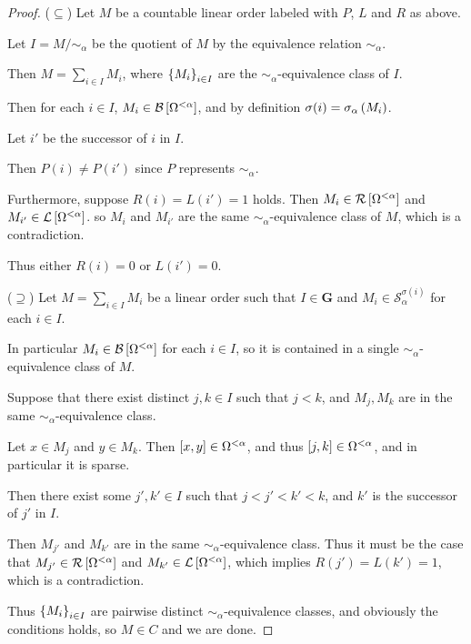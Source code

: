 \begin{proof}
  ($\subseteq$) Let $M$ be a countable linear order labeled with $P$, $L$ and $R$ as above.

  Let $I = M / \sim_{\alpha}$ be the quotient of $M$ by the equivalence relation $\sim_{\alpha}$.

  Then $M = \sum_{i \in I} M_i$,
  where $\left\{ {M_i} \right\}_{i \in I}$ are the $\sim_{\alpha}$-equivalence class of $I$.

  Then for each $i \in I$, $M_i \in \mathcal{B} \left[ {{\Omega^{< \alpha}}} \right]$,
  and by definition $\sigma(i) = \sigma_{\alpha} \left( {M_i} \right)$.

  Let $i'$ be the successor of $i$ in $I$.

  Then $P(i) \ne P(i')$ since $P$ represents $\sim_{\alpha}$.

  Furthermore, suppose $R(i) = L(i') = 1$ holds.
  Then $M_i \in \mathcal{R} \left[ {{\Omega^{< \alpha}}} \right]$ and $M_{i'} \in \mathcal{L} \left[ {{\Omega^{< \alpha}}} \right]$.
  so $M_i$ and $M_{i'}$ are the same $\sim_{\alpha}$-equivalence class of $M$,
  which is a contradiction.
  
  Thus either $R(i) = 0$ or $L(i') = 0$.

  ($\supseteq$) Let $M = \sum_{i \in I} M_i$ be a linear order
  such that $I \in \mathbf{G}$ and $M_i \in \mathcal{S}^{\sigma(i)}_{\alpha}$ for each $i \in I$.

  In particular $M_i \in \mathcal{B} \left[ {{\Omega^{< \alpha}}} \right]$ for each $i \in I$, so it is contained
  in a single $\sim_{\alpha}$-equivalence class of $M$.

  Suppose that there exist distinct $j ,k \in I$ such that $j < k$, and
  $M_j, M_k$ are in the same $\sim_{\alpha}$-equivalence class.

  Let $x \in M_j$ and $y \in M_k$.
  Then $[x, y] \in \Omega^{< \alpha}$, 
  and thus $[j, k] \in \Omega^{< \alpha}$,
  and in particular it is sparse.
  
  Then there exist some $j', k' \in I$ such that $j < j' < k' < k$,
  and $k'$ is the successor of $j'$ in $I$.

  Then $M_{j'}$ and $M_{k'}$ are in the same $\sim_{\alpha}$-equivalence class.
  Thus it must be the case that $M_{j'} \in \mathcal{R} \left[ {{\Omega^{< \alpha}}} \right]$ and $M_{k'} \in \mathcal{L} \left[ {{\Omega^{< \alpha}}} \right]$,
  which implies $R(j') = L(k') = 1$, which is a contradiction.

  Thus $\left\{ {M_i} \right\}_{i \in I}$ are pairwise distinct $\sim_{\alpha}$-equivalence classes,
  and obviously the conditions holds,
  so $M \in C$ and we are done.
\end{proof}


